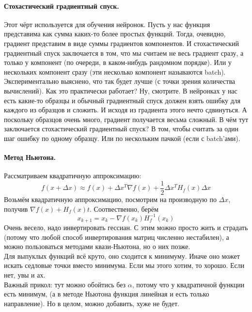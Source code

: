 \documentclass{article}
\begin{document}
    \paragraph{Стохастический градиентный спуск.}
    Этот чёрт используется для обучения нейронок. Пусть у нас функция представима как сумма каких-то более простых функций. Тогда, очевидно, градиент представим в виде суммы градиентов компонентов. И стохастический градиентный спуск заключается в том, что мы считаем не весь градиент сразу, а только у компонент (по очереди, в каком-нибудь рандомном порядке). Или у нескольких компонент сразу (эти несколько компонент называются batch). Экспериментально выяснено, что так будет лучше (с точки зрения количества вычислений). Как это практически работает? Ну, смотрите. В нейронках у нас есть какие-то образцы и обычный градиентный спуск должен взять ошибку для каждого из образцов и сложить. И исходя из градиента этого нечто сдвинуться. А поскольку образцов очень много, градиент получается весьма сложный. В чём тут заключается стохастический градиентный спуск? В том, чтобы считать за один шаг ошибку по одному образцу. Или по нескольким пачкой (если с batch'ами).
    \paragraph{Метод Ньютона.}
    Рассматриваем квадратичную аппроксимацию:
    \[
    f(x+\Delta x)\approx f(x)+\Delta x^T\nabla f(x)+\frac12\Delta x^TH_f(x)\Delta x
    \]
    Возьмём квадратичную аппроксимацию, посмотрим на производную по $\Delta x$, получив $\nabla f(x)+H_f(x)t$. Соотвественно, берём
    \[
    x_{k+1}=x_k-\nabla f(x_k)H_f^{-1}(x_k)
    \]
    Очень весело, надо инвертировать гессиан. С этим можно просто жить и страдать (потому что любой способ инвертирования матриц численно нестабилен), а можно пользоваться методами квази-Ньютона, но о них позже.\\
    Для выпуклых функций всё круто, оно сходится к минимуму. Иначе оно может искать седловые точки вместо минимума. Если мы этого хотим, то хорошо. Если нет, увы и ах.\\
    Важный прикол: тут можно обойтись без $\alpha$, потому что у квадратичной функции есть минимум, (а в методе Ньютона функция линейная и есть только направление). Но в целом, можно добавить, хуже не будет.
\end{document}
